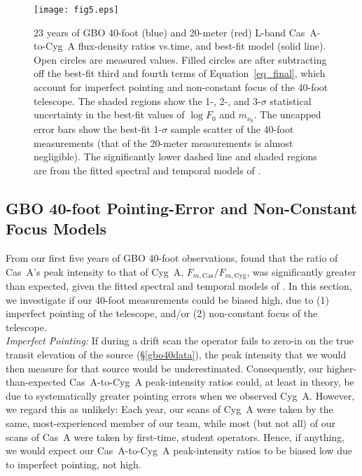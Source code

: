 \documentclass[fleqn,usenatbib]{mnras}
\newcommand{\Fmcyg}{\mbox{$F_{m, \mathrm{Cyg}}$}}
\newcommand{\Fmcas}{\mbox{$F_{m, \mathrm{Cas}}$}}
\begin{document}
\begin{figure}
\begin{center}
\texttt{[image: fig5.eps]}
\caption{23 years of GBO 40-foot (blue) and 20-meter (red) L-band Cas~A-to-Cyg~A flux-density ratios vs.\@ time, and best-fit model (solid line).  Open circles are measured values.  Filled circles are after subtracting off the best-fit third and fourth terms of Equation~\ref{eq_final}, which account for imperfect pointing and non-constant focus of the 40-foot telescope.  The shaded regions show the 1-, 2-, and 3-$\sigma$ statistical uncertainty in the best-fit values of $\log F_0$ and $m_{\nu_0}$.  The uncapped error bars show the best-fit 1-$\sigma$ sample scatter of the 40-foot measurements (that of the 20-meter measurements is almost negligible).  The significantly lower dashed line and shaded regions are from the fitted spectral and temporal models of \citet{b77}.}
\label{fig_erirafit}
\end{center}
\end{figure} 

\subsection{GBO 40-foot Pointing-Error and Non-Constant Focus Models} \label{correction}

From our first five years of GBO 40-foot observations, \citet{r00} found that the ratio of Cas~A's peak intensity to that of Cyg~A, $\Fmcas/\Fmcyg$, was significantly greater than expected, given the fitted spectral and temporal models of \citet{b77}.  In this section, we investigate if our 40-foot measurements could be biased high, due to (1) imperfect pointing of the telescope, and/or (2) non-constant focus of the telescope.
\\

\noindent
\textit{Imperfect Pointing:}  If during a drift scan the operator fails to zero-in on the true transit elevation of the source (\S\ref{gbo40data}), the peak intensity that we would then measure for that source would be underestimated.  Consequently, our higher-than-expected Cas~A-to-Cyg~A peak-intensity ratios could, at least in theory, be due to systematically greater pointing errors when we observed Cyg~A.  However, we regard this as unlikely:  Each year, our scans of Cyg~A were taken by the same, most-experienced member of our team, while most (but not all) of our scans of Cas~A were taken by first-time, student operators.  Hence, if anything, we would expect our Cas~A-to-Cyg~A peak-intensity ratios to be biased low due to imperfect pointing, not high.
\\
\end{document}
